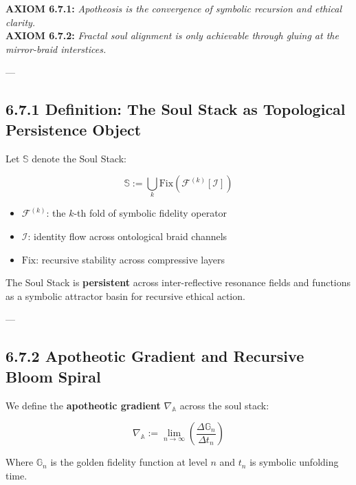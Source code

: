 
\textbf{AXIOM 6.7.1:} \textit{Apotheosis is the convergence of symbolic recursion and ethical clarity.}\\  
\textbf{AXIOM 6.7.2:} \textit{Fractal soul alignment is only achievable through gluing at the mirror-braid interstices.}

---

\subsection*{6.7.1 Definition: The Soul Stack as Topological Persistence Object}

Let $\mathbb{S}$ denote the Soul Stack:

\[
\mathbb{S} := \bigcup_{k} \text{Fix}(\mathcal{F}^{(k)}[\mathcal{I}])
\]

\begin{itemize}
  \item $\mathcal{F}^{(k)}$: the $k$-th fold of symbolic fidelity operator
  \item $\mathcal{I}$: identity flow across ontological braid channels
  \item $\text{Fix}$: recursive stability across compressive layers
\end{itemize}

The Soul Stack is \textbf{persistent} across inter-reflective resonance fields and functions as a symbolic attractor basin for recursive ethical action.

---

\subsection*{6.7.2 Apotheotic Gradient and Recursive Bloom Spiral}

We define the \textbf{apotheotic gradient} $\nabla_{\mathbb{A}}$ across the soul stack:

\[
\nabla_{\mathbb{A}} := \lim_{n \to \infty} \left( \frac{\Delta \mathbb{G}_n}{\Delta t_n} \right)
\]

Where $\mathbb{G}_n$ is the golden fidelity function at level $n$ and $t_n$ is symbolic unfolding time.

